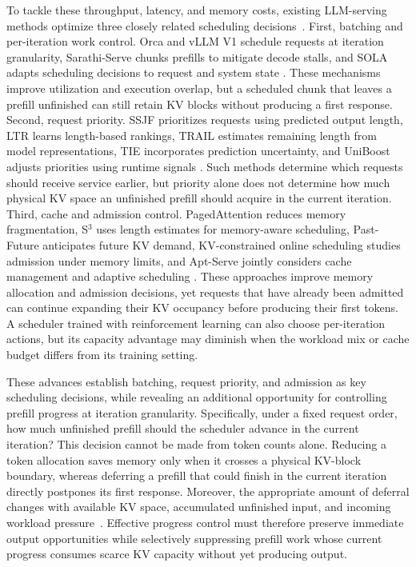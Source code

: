 \documentclass[sigconf,anonymous,review]{acmart}
\begin{document}
To tackle these throughput, latency, and memory costs, existing LLM-serving methods optimize three closely related scheduling decisions~\cite{wu2026fastserve,sun2024llumnix,she2026plaserve}. First, batching and per-iteration work control. Orca and vLLM V1 schedule requests at iteration granularity, Sarathi-Serve chunks prefills to mitigate decode stalls, and SOLA adapts scheduling decisions to request and system state \cite{intro_orca,intro_vllm,intro_sarathi,intro_sola}. These mechanisms improve utilization and execution overlap, but a scheduled chunk that leaves a prefill unfinished can still retain KV blocks without producing a first response. Second, request priority. SSJF prioritizes requests using predicted output length, LTR learns length-based rankings, TRAIL estimates remaining length from model representations, TIE incorporates prediction uncertainty, and UniBoost adjusts priorities using runtime signals \cite{intro_ssjf,intro_ltr,intro_trail,intro_tie,intro_uniboost}. Such methods determine which requests should receive service earlier, but priority alone does not determine how much physical KV space an unfinished prefill should acquire in the current iteration. Third, cache and admission control. PagedAttention reduces memory fragmentation, S$^3$ uses length estimates for memory-aware scheduling, Past-Future anticipates future KV demand, KV-constrained online scheduling studies admission under memory limits, and Apt-Serve jointly considers cache management and adaptive scheduling \cite{intro_vllm,intro_s3,intro_pastfuture,intro_onlinekv,intro_aptserve}. These approaches improve memory allocation and admission decisions, yet requests that have already been admitted can continue expanding their KV occupancy before producing their first tokens.
A scheduler trained with reinforcement learning can also choose per-iteration actions, but its capacity advantage may diminish when the workload mix or cache budget differs from its training setting.

These advances establish batching, request priority, and admission as key scheduling decisions, while revealing an additional opportunity for controlling prefill progress at iteration granularity. Specifically, under a fixed request order, how much unfinished prefill should the scheduler advance in the current iteration? This decision cannot be made from token counts alone. Reducing a token allocation saves memory only when it crosses a physical KV-block boundary, whereas deferring a prefill that could finish in the current iteration directly postpones its first response. Moreover, the appropriate amount of deferral changes with available KV space, accumulated unfinished input, and incoming workload pressure~\cite{saemann2026ppas}. Effective progress control must therefore preserve immediate output opportunities while selectively suppressing prefill work whose current progress consumes scarce KV capacity without yet producing output.
\end{document}
